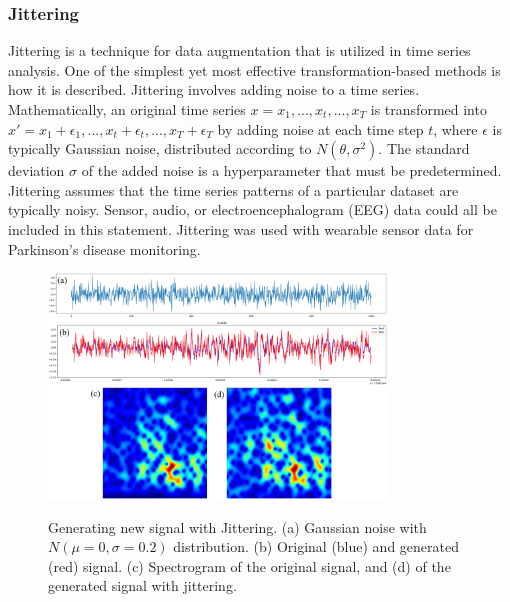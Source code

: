 \documentclass[journal]{IEEEtran}
\begin{document}
\subsubsection{Jittering}
Jittering is a technique for data augmentation that is utilized in time series analysis\cite{iwana2021empirical,iglesias2023data}. One of the simplest yet most effective transformation-based methods is how it is described. Jittering involves adding noise to a time series.
Mathematically, an original time series $x={x_1,...,x_t,...,x_T}$ is transformed into $x'={x_1+\epsilon_1,...,x_t+\epsilon_t,...,x_T+\epsilon_T}$ by adding noise at each time step $t$, where $\epsilon$ is typically Gaussian noise, distributed according to $N(\theta,\sigma^2)$. The standard deviation $\sigma$ of the added noise is a hyperparameter that must be predetermined\cite{iwana2021empirical}.
Jittering assumes that the time series patterns of a particular dataset are typically noisy. Sensor, audio, or electroencephalogram (EEG) data could all be included in this statement. Jittering was used with wearable sensor data for Parkinson's disease monitoring.
\begin{figure}
\centering
{\includegraphics[width=0.8\textwidth,keepaspectratio]{img/da_jittering.png}}
\caption{Generating new signal with Jittering. (a) Gaussian noise with $N(\mu=0,\sigma=0.2)$ distribution. (b) Original (blue) and generated (red) signal. (c) Spectrogram of the original signal, and (d) of the generated signal with jittering.}
\label{fig:da_jittering}
\end{figure}
\end{document}
